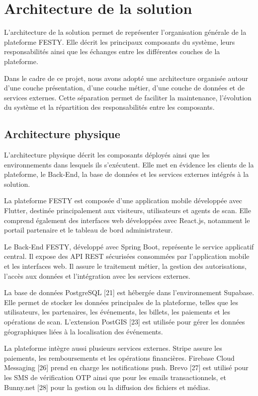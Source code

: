 \section{Architecture de la solution}


L’architecture de la solution permet de représenter l’organisation générale de la plateforme FESTY. Elle décrit les principaux composants du système, leurs responsabilités ainsi que les échanges entre les différentes couches de la plateforme.


Dans le cadre de ce projet, nous avons adopté une architecture organisée autour d’une couche présentation, d’une couche métier, d’une couche de données et de services externes. Cette séparation permet de faciliter la maintenance, l’évolution du système et la répartition des responsabilités entre les composants.


\subsection{Architecture physique}


L’architecture physique décrit les composants déployés ainsi que les environnements dans lesquels ils s’exécutent. Elle met en évidence les clients de la plateforme, le Back-End, la base de données et les services externes intégrés à la solution.


La plateforme FESTY est composée d’une application mobile développée avec Flutter, destinée principalement aux visiteurs, utilisateurs et agents de scan. Elle comprend également des interfaces web développées avec React.js, notamment le portail partenaire et le tableau de bord administrateur.


Le Back-End FESTY, développé avec Spring Boot, représente le service applicatif central. Il expose des API REST sécurisées consommées par l’application mobile et les interfaces web. Il assure le traitement métier, la gestion des autorisations, l’accès aux données et l’intégration avec les services externes.


La base de données PostgreSQL [21] est hébergée dans l’environnement Supabase. Elle permet de stocker les données principales de la plateforme, telles que les utilisateurs, les partenaires, les événements, les billets, les paiements et les opérations de scan. L’extension PostGIS [23] est utilisée pour gérer les données géographiques liées à la localisation des événements.


La plateforme intègre aussi plusieurs services externes. Stripe assure les paiements, les remboursements et les opérations financières. Firebase Cloud Messaging [26] prend en charge les notifications push. Brevo [27] est utilisé pour les SMS de vérification OTP ainsi que pour les emails transactionnels, et Bunny.net [28] pour la gestion ou la diffusion des fichiers et médias.


